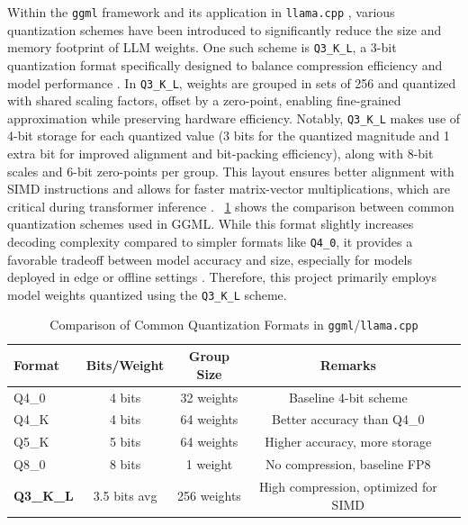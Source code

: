 Within the \texttt{ggml} framework and its application in \texttt{llama.cpp} \cite{llamacpp2023}, various quantization schemes have been introduced to significantly reduce the size and memory footprint of LLM weights. One such scheme is \texttt{Q3\_K\_L}, a 3-bit quantization format specifically designed to balance compression efficiency and model performance \cite{talamdupula2024guide,li2024quantization}. In \texttt{Q3\_K\_L}, weights are grouped in sets of 256 and quantized with shared scaling factors, offset by a zero-point, enabling fine-grained approximation while preserving hardware efficiency. Notably, \texttt{Q3\_K\_L} makes use of 4-bit storage for each quantized value (3 bits for the quantized magnitude and 1 extra bit for improved alignment and bit-packing efficiency), along with 8-bit scales and 6-bit zero-points per group. This layout ensures better alignment with SIMD instructions and allows for faster matrix-vector multiplications, which are critical during transformer inference \cite{pope2022efficiently}. ~\ref{tab:quantization-comparison} shows the comparison between common quantization schemes used in GGML. While this format slightly increases decoding complexity compared to simpler formats like \texttt{Q4\_0}, it provides a favorable tradeoff between model accuracy and size, especially for models deployed in edge or offline settings \cite{ollama2023,llamafile2023}.
Therefore, this project primarily employs model weights quantized using the \texttt{Q3\_K\_L} scheme.

\begin{table}[h]
\centering
\caption{Comparison of Common Quantization Formats in \texttt{ggml}/\texttt{llama.cpp}}
\label{tab:quantization-comparison}
\begin{tabular}{|l|c|c|c|c|}
\hline
\textbf{Format} & \textbf{Bits/Weight} & \textbf{Group Size} & \textbf{Remarks} \\ \hline
Q4\_0     & 4 bits   & 32 weights          & Baseline 4-bit scheme \\ \hline
Q4\_K     & 4 bits   & 64 weights    & Better accuracy than Q4\_0 \\ \hline
Q5\_K     & 5 bits   & 64 weights           & Higher accuracy, more storage \\ \hline
Q8\_0     & 8 bits   & 1 weight                          & No compression, baseline FP8 \\ \hline
\textbf{Q3\_K\_L}  & 3.5 bits avg & 256 weights  & High compression, optimized for SIMD \\ \hline
\end{tabular}
\end{table}
